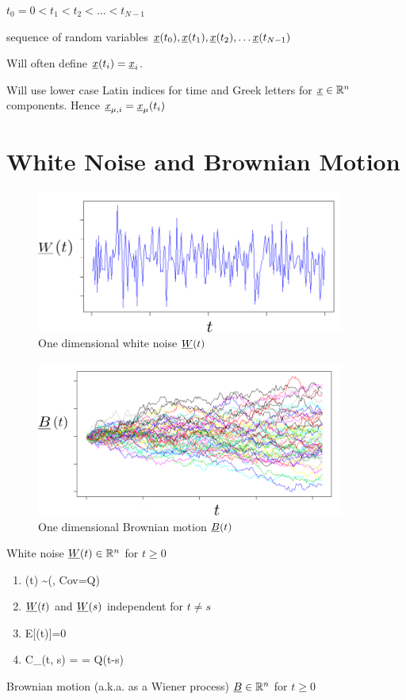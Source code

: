 $t_0=0 < t_1 < t_2 <\ldots< t_{N-1}$

sequence of random variables ${\underline{x}}(t_0),
 {\underline{x}}(t_1), {\underline{x}}(t_2), \ldots {\underline{x}}(t_{N-1})$
 
Will often define ${\underline{x}}(t_i) ={\underline{x}}_i$.

Will use lower case Latin indices for time
and Greek letters for ${\underline{x}}\in{ \mathbb{R}}^n$ components.
Hence ${\underline{x}}_{\mu, i}={\underline{x}}_\mu(t_i)$



 
 \section{White Noise and Brownian Motion}
 
 \begin{figure}[h!]
 \centering
 \includegraphics[width=4in]
 {stochastic-diff-eqns/white-noise-labeled}
 \caption{One dimensional white noise ${\underline{W}}(t)$}
 \label{fig-white-noise-t}
 \end{figure}
 
 \begin{figure}[h!]
  \centering
  \includegraphics[width=4in]
  {stochastic-diff-eqns/brownian-motion-labeled}
  \caption{One dimensional Brownian motion ${\underline{B}}(t)$}
  \label{fig-brownian-motion-t}
  \end{figure}
  
 

White noise ${\underline{W}}(t)
\in{ \mathbb{R}}^n$ for $t\geq 0$

\begin{enumerate}
\item
\beq
\rvW(t) \sim \caln(, Cov=Q)
\eeq

\item
${\underline{W}}(t)$ and ${\underline{W}}(s)$ independent for
$t\neq s$

\item

\beq E[\rvW(t)]=0
\eeq

\item
\beq
C_\rvW(t, s) =  = Q\delta(t-s)
\eeq



\end{enumerate}
Brownian motion (a.k.a. as a Wiener process) ${\underline{B}}\in{ \mathbb{R}}^n$
for $t\geq 0$

